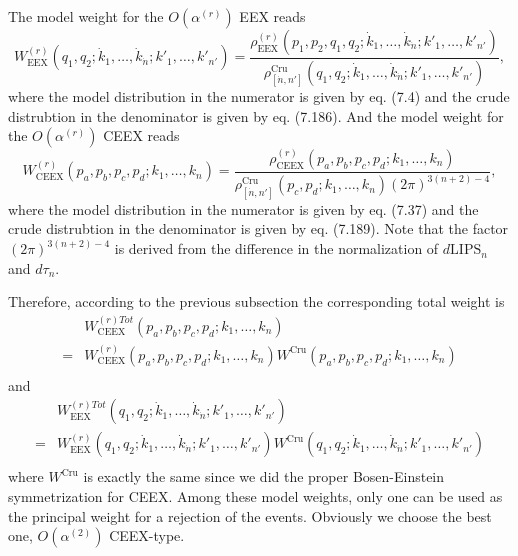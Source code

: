 The model weight for the $O(\alpha^{(r)})$ EEX reads
\begin{equation}
W^{(r)}_\text{EEX}(q_1,q_2;\dot{k}_1,\ldots,\dot{k}_{\dot{n}};k'_1,\ldots,k'_{n'})=\frac{\rho^{(r)}_\text{EEX}(p_1,p_2,q_1,q_2;\dot{k}_1,\ldots,\dot{k}_{\dot{n}};k'_1,\ldots,k'_{n'})}{\rho_{[\dot{n},n']}^\text{Cru}(q_1,q_2;\dot{k}_1,\ldots,\dot{k}_{\dot{n}};k'_1,\ldots,k'_{n'})},
\end{equation}
where the model distribution in the numerator is given by eq. (7.4) and the crude distrubtion in the denominator is given by eq. (7.186). And the model weight for the $O(\alpha^{(r)})$ CEEX reads
\begin{equation}
W^{(r)}_\text{CEEX}(p_a,p_b,p_c,p_d;k_1,\ldots,k_{n})=\frac{\rho^{(r)}_\text{CEEX}(p_a,p_b,p_c,p_d;k_1,\ldots,k_{n})}{\rho_{[\dot{n},n']}^\text{Cru}(p_c,p_d;k_1,\ldots,k_{n})(2\pi)^{3(n+2)-4}},
\end{equation}
where the model distribution in the numerator is given by eq. (7.37) and the crude distrubtion in the denominator is given by eq. (7.189). Note that the factor $(2\pi)^{3(n+2)-4}$ is derived from the difference in the normalization of $d\text{LIPS}_n$ and $d\tau_n$.


Therefore, according to the previous subsection the corresponding total weight is
\begin{align}
&W^{(r)Tot}_\text{CEEX}(p_a,p_b,p_c,p_d;k_1,\ldots,k_{n})\nonumber\\=&W^{(r)}_\text{CEEX}(p_a,p_b,p_c,p_d;k_1,\ldots,k_{n})W^\text{Cru}(p_a,p_b,p_c,p_d;k_1,\ldots,k_{n})\nonumber\\
\end{align}
and
\begin{align}
&W^{(r)Tot}_\text{EEX}(q_1,q_2;\dot{k}_1,\ldots,\dot{k}_{\dot{n}};k'_1,\ldots,k'_{n'})\nonumber\\=&W^{(r)}_\text{EEX}(q_1,q_2;\dot{k}_1,\ldots,\dot{k}_{\dot{n}};k'_1,\ldots,k'_{n'})W^\text{Cru}(q_1,q_2;\dot{k}_1,\ldots,\dot{k}_{\dot{n}};k'_1,\ldots,k'_{n'})\nonumber\\
\end{align}
where $W^\text{Cru}$ is exactly the same since we did the proper Bosen-Einstein symmetrization for CEEX. Among these model weights, only one can be used as the principal weight for a rejection of the events. Obviously we choose the best one, $O(\alpha^{(2)})$ CEEX-type. 


